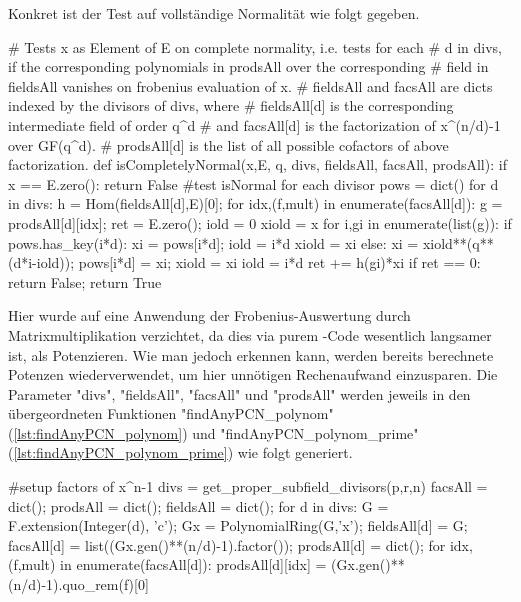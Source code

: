 Konkret ist der Test auf vollständige Normalität wie folgt gegeben.


\begin{sagecode}[caption={Aus \url{../Sage/findAnyPCN_trinom.spyx}}]
# Tests x as Element of E on complete normality, i.e. tests for each 
# d in divs, if the corresponding polynomials in prodsAll over the corresponding
# field in fieldsAll vanishes on frobenius evaluation of x.
# fieldsAll and facsAll are dicts indexed by the divisors of divs, where
# fieldsAll[d] is the corresponding intermediate field of order q^d
# and facsAll[d] is the factorization of x^(n/d)-1 over GF(q^d).
# prodsAll[d] is the list of all possible cofactors of above factorization.
def isCompletelyNormal(x,E, q, divs, fieldsAll, facsAll, prodsAll):
    if x == E.zero(): return False
    #test isNormal for each divisor
    pows = dict()
    for d in divs:
        h = Hom(fieldsAll[d],E)[0];
        for idx,(f,mult) in enumerate(facsAll[d]):
            g = prodsAll[d][idx];
            ret = E.zero();
            iold = 0
            xiold = x
            for i,gi in enumerate(list(g)):
                if pows.has_key(i*d):
                    xi = pows[i*d];
                    iold = i*d
                    xiold = xi
                else:
                    xi = xiold**(q**(d*i-iold));
                    pows[i*d] = xi;
                    xiold = xi
                    iold = i*d
                ret += h(gi)*xi
            if ret == 0: return False;
    return True
\end{sagecode}

Hier wurde auf eine Anwendung der Frobenius-Auswertung durch
Matrixmultiplikation verzichtet, da dies via purem \sage-Code wesentlich
langsamer ist, als Potenzieren. Wie man jedoch erkennen kann, werden bereits
berechnete Potenzen wiederverwendet, um hier unnötigen Rechenaufwand
einzusparen.
Die Parameter "divs", "fieldsAll", "facsAll" und "prodsAll" werden jeweils in
den übergeordneten Funktionen "findAnyPCN_polynom" 
(\autoref{lst:findAnyPCN_polynom}) und
"findAnyPCN_polynom_prime" (\autoref{lst:findAnyPCN_polynom_prime})
wie folgt generiert.

\begin{sagecode}[caption={Aus \url{../Sage/findAnyPCN_trinom.spyx}}]
    #setup factors of x^n-1
    divs = get_proper_subfield_divisors(p,r,n)
    facsAll = dict();
    prodsAll = dict();
    fieldsAll = dict();
    for d in divs:
        G = F.extension(Integer(d), 'c');
        Gx = PolynomialRing(G,'x');
        fieldsAll[d] = G;
        facsAll[d] = list((Gx.gen()**(n/d)-1).factor());
        prodsAll[d] = dict();
        for idx,(f,mult) in enumerate(facsAll[d]):
            prodsAll[d][idx] = (Gx.gen()**(n/d)-1).quo_rem(f)[0]
\end{sagecode}




